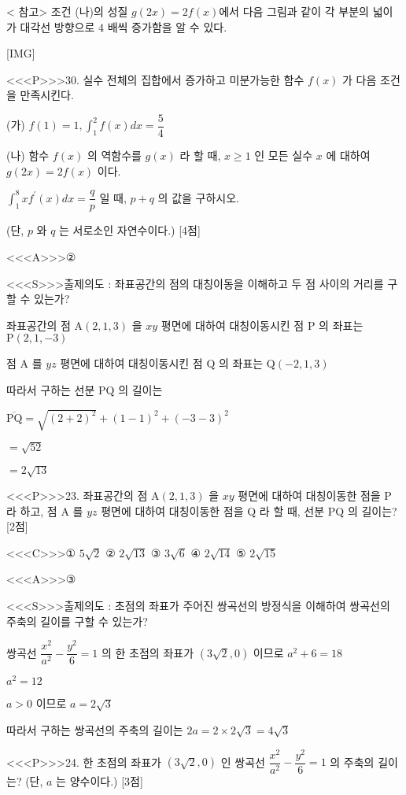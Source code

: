 \documentclass{oblivoir}
\begin{document}
< 참고>
조건 (나)의 성질 $g(2 x)=2 f(x)$에서 다음 그림과 같이 각 부분의 넓이가 대각선 방향으로 $4$ 배씩 증가함을 알 수 있다.

[IMG]


<<<P>>>30. 실수 전체의 집합에서 증가하고 미분가능한 함수 $f(x)$ 가 다음 조건을 만족시킨다.

(가) $f(1)=1, \displaystyle\int_{1}^{2} f(x) d x=\dfrac{5}{4}$

(나) 함수 $f(x)$ 의 역함수를 $g(x)$ 라 할 때, $x \geq 1$ 인 모든 실수 $x$ 에 대하여 $g(2 x)=2 f(x)$ 이다.

$\displaystyle\int_{1}^{8} x f^{\prime}(x) d x=\dfrac{q}{p}$ 일 때, $p+q$ 의 값을 구하시오.

(단, $p$ 와 $q$ 는 서로소인 자연수이다.) [4점]

<<<A>>>②

<<<S>>>출제의도 : 좌표공간의 점의 대칭이동을 이해하고 두 점 사이의 거리를 구할 수 있는가?

좌표공간의 점 $\mathrm{A}(2,1,3)$ 을 $x y$ 평면에 대하여 대칭이동시킨 점 $\mathrm{P}$ 의 좌표는
$\mathrm{P}(2,1,-3)$

점 $\mathrm{A}$ 를 $y z$ 평면에 대하여 대칭이동시킨 점 $\mathrm{Q}$ 의 좌표는
$\mathrm{Q}(-2,1,3)$

따라서 구하는 선분 $\mathrm{PQ}$ 의 길이는

$\overline{\mathrm{PQ}}=\sqrt{(2+2)^{2}}+(1-1)^{2}+(-3-3)^{2}$

$=\sqrt{52}$

$=2 \sqrt{13}$


<<<P>>>23. 좌표공간의 점 $\mathrm{A}(2,1,3)$ 을 $x y$ 평면에 대하여 대칭이동한 점을 $\mathrm{P}$ 라 하고, 점 $\mathrm{A}$ 를 $y z$ 평면에 대하여 대칭이동한 점을 $\mathrm{Q}$ 라 할 때, 선분 $\mathrm{PQ}$ 의 길이는? [2점]

<<<C>>>① $5 \sqrt{2}$
② $2 \sqrt{13}$
③ $3 \sqrt{6}$
④ $2 \sqrt{14}$
⑤ $2 \sqrt{15}$


<<<A>>>③

<<<S>>>출제의도 : 초점의 좌표가 주어진 쌍곡선의 방정식을 이해하여 쌍곡선의 주축의 길이를 구할 수 있는가?

쌍곡선 $\dfrac{x^{2}}{a^{2}}-\dfrac{y^{2}}{6}=1$ 의 한 초점의 좌표가
$(3 \sqrt{2}, 0)$ 이므로
$a^{2}+6=18$

$a^{2}=12$

$a>0$ 이므로
$a=2 \sqrt{3}$

따라서 구하는 쌍곡선의 주축의 길이는 $2 a=2 \times 2 \sqrt{3}=4 \sqrt{3}$


<<<P>>>24. 한 초점의 좌표가 $(3 \sqrt{2}, 0)$ 인 쌍곡선 $\dfrac{x^{2}}{a^{2}}-\dfrac{y^{2}}{6}=1$ 의 주축의 길이는? (단, $a$ 는 양수이다.) [3점]
\end{document}
